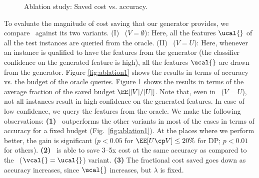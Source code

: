 \documentclass[letterpaper]{article}
\begin{document}
\begin{figure}[!t]
\begin{minipage}{.40\textwidth}
        \caption{\small Ablation study: Saved cost  vs. accuracy.}
        \label{fig:ablation2}
    \end{minipage}
\end{figure}
To evaluate the magnitude of cost saving that our generator provides, we compare \our\ against its two variants.  (I) \our\ ($V=\emptyset$): Here, all the features $\ucal{}$ of all the test instances are queried from the oracle.
(II) \our\ ($V=U$): Here, whenever an instance is qualified 
to have the features from the generator (the classifier confidence on the generated feature is high), all the features $\ucal{}$ are drawn from the generator. Figure \ref{fig:ablation1} shows the results in terms of accuracy vs. the budget of the oracle queries.  Figure \ref{fig:ablation2} shows the results in terms of the average fraction of the saved budget $\EE[|V|/|U|]$. Note that,  even in \our\ ($V=U$), not all instances result in high confidence on the generated features. In case of low confidence, we query the features from the oracle. 
We make the following observations:
\textbf{(1)} \our\ outperforms the other variants in most of the cases in terms of accuracy for a fixed budget (Fig.~\ref{fig:ablation1}).  At the places where we perform better, the gain is significant ($p<0.05$ for $\EE[U\cp V]\le 20\%$ for DP; $p<0.01$ for others).
\textbf{(2)} \our\ is able to save 3--5x cost at the same accuracy as compared to the \our\ ($\vcal{}=\ucal{}$) variant. 
\textbf{(3)} The fractional cost saved goes down as accuracy increases, since $\ucal{}$ increases, but $\lambda$ is fixed.
\end{document}
